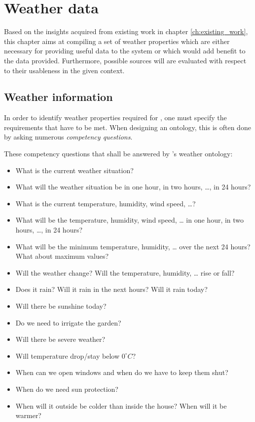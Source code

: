 \chapter{Weather data}
\label{ch:weather_data}

Based on the insights acquired from existing work in chapter \ref{ch:existing_work}, this chapter aims at compiling a set of weather properties which are either necessary for providing useful data to the \thinkhome system or which would add benefit to the data provided. Furthermore, possible sources will are evaluated with respect to their usableness in the given context.

\section{Weather information}
\label{sec:weather_information}

In order to identify weather properties required for \thinkhome, one must specify the requirements that have to be met. When designing an ontology, this is often done by asking numerous \emph{competency questions}.

These competency questions that shall be answered by \thinkhome's weather ontology:

\begin{itemize}
  \item What is the current weather situation?
  \item What will the weather situation be in one hour, in two hours, …, in 24 hours?
  \item What is the current temperature, humidity, wind speed, …?
  \item What will be the temperature, humidity, wind speed, … in one hour, in two hours, …, in 24 hours?
  \item What will be the minimum temperature, humidity, … over the next 24 hours? What about maximum values?
  \item Will the weather change? Will the temperature, humidity, … rise or fall?
  \item Does it rain? Will it rain in the next hours? Will it rain today?
  \item Will there be sunshine today? 
  \item Do we need to irrigate the garden?
  \item Will there be severe weather?
  \item Will temperature drop/stay below $0^\circ C$?
  \item When can we open windows and when do we have to keep them shut?
  \item When do we need sun protection?
  \item When will it outside be colder than inside the house? When will it be warmer?
\end{itemize}

